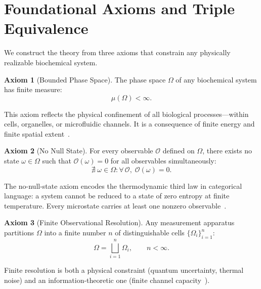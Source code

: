 \documentclass[10pt,twocolumn]{article}
\theoremstyle{definition}
\newtheorem{axiom}{Axiom}
\theoremstyle{remark}
\begin{document}
\section{Foundational Axioms and Triple Equivalence}\label{sec:axioms}

We construct the theory from three axioms that constrain any
physically realizable biochemical system.

\begin{axiom}[Bounded Phase Space]\label{ax:bounded}
The phase space $\Omega$ of any biochemical system has finite measure:
\begin{equation}
  \mu(\Omega) < \infty.
\end{equation}
\end{axiom}

This axiom reflects the physical confinement of all biological
processes---within cells, organelles, or microfluidic channels.
It is a consequence of finite energy and finite spatial extent~\cite{Callen1985,Landau1980}.

\begin{axiom}[No Null State]\label{ax:nonull}
For every observable $\mathcal{O}$ defined on $\Omega$, there exists
no state $\omega \in \Omega$ such that $\mathcal{O}(\omega) = 0$
for all observables simultaneously:
\begin{equation}
  \nexists\; \omega \in \Omega : \forall\, \mathcal{O},\;
  \mathcal{O}(\omega) = 0.
\end{equation}
\end{axiom}

The no-null-state axiom encodes the thermodynamic third law in
categorical language: a system cannot be reduced to a state of
zero entropy at finite temperature.  Every microstate carries
at least one nonzero observable~\cite{Jaynes1957}.

\begin{axiom}[Finite Observational Resolution]\label{ax:resolution}
Any measurement apparatus partitions $\Omega$ into a finite number
$n$ of distinguishable cells $\{\Omega_i\}_{i=1}^{n}$:
\begin{equation}
  \Omega = \bigsqcup_{i=1}^{n} \Omega_i, \qquad n < \infty.
\end{equation}
\end{axiom}

Finite resolution is both a physical constraint (quantum uncertainty,
thermal noise) and an information-theoretic one (finite channel
capacity~\cite{Shannon1948,Cover2006}).
\end{document}
